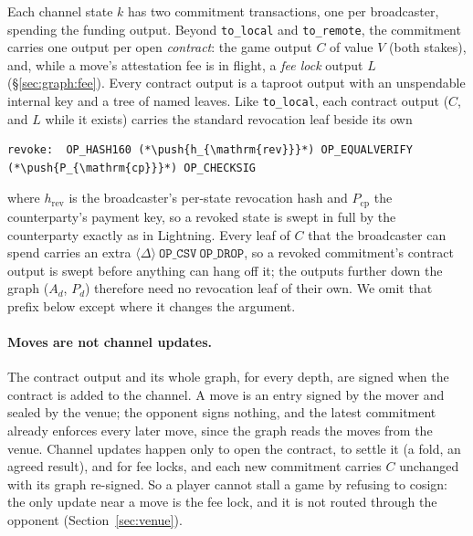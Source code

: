 \documentclass[11pt]{article}
\newcommand{\op}[1]{\texttt{OP\_#1}}
\newcommand{\push}[1]{\ensuremath{\langle #1\rangle}}
\newcommand{\tsd}{\Delta}
\begin{document}
Each channel state $k$ has two commitment transactions, one per
broadcaster, spending the funding output. Beyond \texttt{to\_local} and
\texttt{to\_remote}, the commitment carries one output per open
\emph{contract}: the game output $C$ of value $V$ (both stakes), and,
while a move's attestation fee is in flight, a \emph{fee lock} output
$L$ (\S\ref{sec:graph:fee}). Every contract output is a taproot output
with an unspendable internal key and a tree of named leaves. Like
\texttt{to\_local}, each contract output ($C$, and $L$ while it exists)
carries the standard revocation leaf beside its own
\begin{lstlisting}[style=script]
revoke:  OP_HASH160 (*\push{h_{\mathrm{rev}}}*) OP_EQUALVERIFY (*\push{P_{\mathrm{cp}}}*) OP_CHECKSIG
\end{lstlisting}
where $h_{\mathrm{rev}}$ is the broadcaster's per-state revocation
hash and $P_{\mathrm{cp}}$ the counterparty's payment key, so a revoked
state is swept in full by the counterparty exactly as in Lightning.
Every leaf of $C$ that the broadcaster can spend carries an extra
$\push{\tsd}\ \op{CSV}\ \op{DROP}$, so a revoked commitment's contract
output is swept before anything can hang off it; the outputs further
down the graph ($A_d$, $P_d$) therefore need no revocation leaf of
their own. We omit that prefix below except where it changes the
argument.

\paragraph{Moves are not channel updates.} The contract output and its
whole graph, for every depth, are signed when the contract is added to
the channel. A move is an entry signed by the mover and sealed by the
venue; the opponent signs nothing, and the latest commitment already
enforces every later move, since the graph reads the moves from the
venue. Channel updates happen only to open the contract, to settle it
(a fold, an agreed result), and for fee locks, and each new commitment
carries $C$ unchanged with its graph re-signed. So a player cannot stall
a game by refusing to cosign: the only update near a move is the fee
lock, and it is not routed through the opponent
(Section~\ref{sec:venue}).
\end{document}
